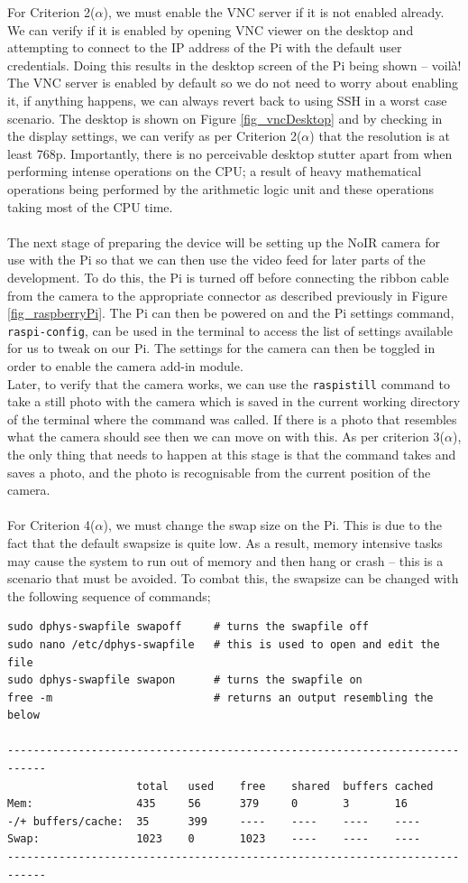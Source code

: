 \documentclass[9pt]{article}
\begin{document}
For Criterion 2($\alpha$), we must enable the VNC server if it is not enabled already. We can verify if it is enabled by opening VNC viewer on the desktop and attempting to connect to the IP address of the Pi with the default user credentials. Doing this results in the desktop screen of the Pi being shown -- voilà! The VNC server is enabled by default so we do not need to worry about enabling it, if anything happens, we can always revert back to using SSH in a worst case scenario. The desktop is shown on Figure \ref{fig_vncDesktop} and by checking in the display settings, we can verify as per Criterion 2($\alpha$) that the resolution is at least 768p. Importantly, there is no perceivable desktop stutter apart from when performing intense operations on the CPU; a result of heavy mathematical operations being performed by the arithmetic logic unit and these operations taking most of the CPU time.\\\\
The next stage of preparing the device will be setting up the NoIR camera for use with the Pi so that we can then use the video feed for later parts of the development. To do this, the Pi is turned off before connecting the ribbon cable from the camera to the appropriate connector as described previously in Figure \ref{fig_raspberryPi}. The Pi can then be powered on and the Pi settings command, \texttt{raspi-config}, can be used in the terminal to access the list of settings available for us to tweak on our Pi. The settings for the camera can then be toggled in order to enable the camera add-in module.\\
Later, to verify that the camera works, we can use the \texttt{raspistill} command to take a still photo with the camera which is saved in the current working directory of the terminal where the command was called. If there is a photo that resembles what the camera should see then we can move on with this. As per criterion 3($ \alpha $), the only thing that needs to happen at this stage is that the command takes and saves a photo, and the photo is recognisable from the current position of the camera.\\\\
For Criterion 4($ \alpha $), we must change the swap size on the Pi. This is due to the fact that the default swapsize is quite low. As a result, memory intensive tasks may cause the system to run out of memory and then hang or crash -- this is a scenario that must be avoided. To combat this, the swapsize can be changed with the following sequence of commands;
\begin{lstlisting}
sudo dphys-swapfile swapoff		# turns the swapfile off
sudo nano /etc/dphys-swapfile	# this is used to open and edit the file
sudo dphys-swapfile swapon		# turns the swapfile on
free -m							# returns an output resembling the below

----------------------------------------------------------------------------
					total	used	free	shared	buffers	cached
Mem:          		435     56		379		0		3       16
-/+ buffers/cache: 	35      399		----	----	----	----
Swap:         		1023    0     	1023	----	----	----
----------------------------------------------------------------------------
\end{lstlisting}
\end{document}
